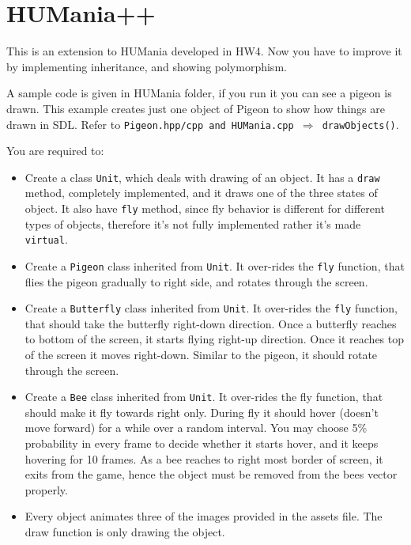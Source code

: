 \documentclass[a4paper,12pt]{article}
\begin{document}
	

	\section{HUMania++}
	
	This is an extension to HUMania developed in HW4. Now you have to improve it by implementing inheritance, and showing polymorphism. 
	
	A sample code is given in HUMania folder, if you run it you can see a pigeon is drawn. This example creates just one object of Pigeon to show how things are drawn in SDL. Refer to \texttt{Pigeon.hpp/cpp and HUMania.cpp $ \Rightarrow $ drawObjects()}.
	
	 You are required to:
	 \begin{itemize}
	 	\item Create a class \texttt{Unit}, which deals with drawing of an object. It has a \texttt{draw} method, completely implemented, and it draws one of the three states of object. It also have \texttt{fly} method, since fly behavior is different for different types of objects, therefore it's not fully implemented rather it's made \texttt{virtual}.
	 	
	 	\item Create a \texttt{Pigeon} class inherited from \texttt{Unit}. It over-rides the \texttt{fly} function, that flies the pigeon gradually to right side, and rotates through the screen. 
	 	
	 	\item Create a \texttt{Butterfly} class inherited from \texttt{Unit}. It over-rides the \texttt{fly} function, that should take the butterfly right-down direction. Once a butterfly reaches to bottom of the screen, it starts flying right-up direction. Once it reaches top of the screen it moves right-down. Similar to the pigeon, it should rotate through the screen. 
	 	
	 	\item Create a \texttt{Bee} class inherited from \texttt{Unit}. It over-rides the fly function, that should make it fly towards right only. During fly it should hover (doesn't move forward) for a while over a random interval. You may choose 5\% probability in every frame to decide whether it starts hover, and it keeps hovering for 10 frames. As a bee reaches to right most border of screen, it exits from the game, hence the object must be removed from the bees vector properly.  
	 	
	 	\item Every object animates three of the images provided in the assets file. The draw function is only drawing the object.
	 	

\end{itemize}
\end{document}
